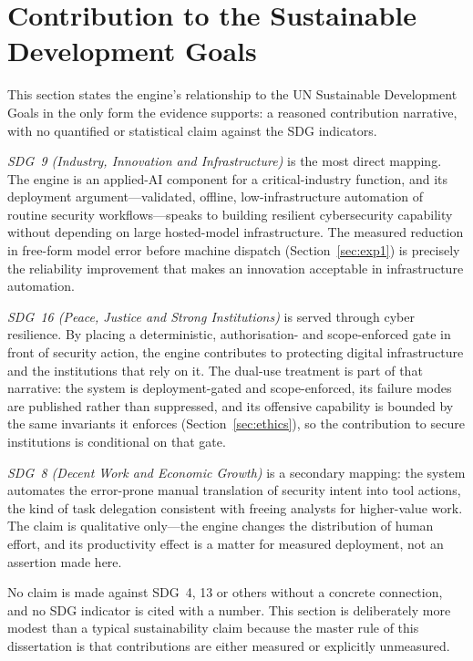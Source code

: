 \section{Contribution to the Sustainable Development Goals}\label{sec:sdg}

This section states the engine's relationship to the UN Sustainable Development
Goals in the only form the evidence supports: a reasoned contribution
narrative, with no quantified or statistical claim against the SDG indicators.

\emph{SDG~9 (Industry, Innovation and Infrastructure)} is the most direct
mapping. The engine is an applied-AI component for a critical-industry
function, and its deployment argument---validated, offline, low-infrastructure
automation of routine security workflows---speaks to building resilient
cybersecurity capability without depending on large hosted-model infrastructure.
The measured reduction in free-form model error before machine dispatch
(Section~\ref{sec:exp1}) is precisely the reliability improvement that makes an
innovation acceptable in infrastructure automation.

\emph{SDG~16 (Peace, Justice and Strong Institutions)} is served through cyber
resilience. By placing a deterministic, authorisation- and scope-enforced gate
in front of security action, the engine contributes to protecting digital
infrastructure and the institutions that rely on it. The dual-use treatment is
part of that narrative: the system is deployment-gated and scope-enforced, its
failure modes are published rather than suppressed, and its offensive
capability is bounded by the same invariants it enforces
(Section~\ref{sec:ethics}), so the contribution to secure institutions is
conditional on that gate.

\emph{SDG~8 (Decent Work and Economic Growth)} is a secondary mapping: the
system automates the error-prone manual translation of security intent into
tool actions, the kind of task delegation consistent with freeing analysts for
higher-value work. The claim is qualitative only---the engine changes the
distribution of human effort, and its productivity effect is a matter for
measured deployment, not an assertion made here.

No claim is made against SDG~4, 13 or others without a concrete connection, and
no SDG indicator is cited with a number. This section is deliberately more
modest than a typical sustainability claim because the master rule of this
dissertation is that contributions are either measured or explicitly unmeasured.
